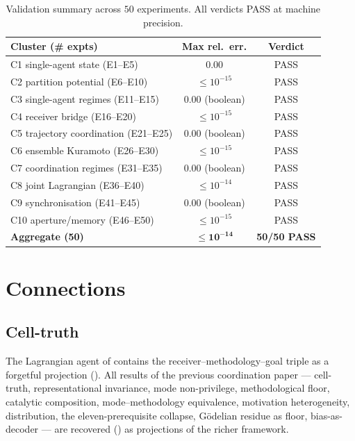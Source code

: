 \documentclass[11pt,twocolumn,a4paper]{article}
\begin{document}
\begin{table}[h!]\centering
\begin{tabular}{lcc}
\toprule
\textbf{Cluster (\# expts)} & \textbf{Max rel.\ err.} & \textbf{Verdict}\\\midrule
C1 single-agent state (E1--E5) & $0.00$ & PASS\\
C2 partition potential (E6--E10) & $\le 10^{-15}$ & PASS\\
C3 single-agent regimes (E11--E15) & $0.00$ (boolean) & PASS\\
C4 receiver bridge (E16--E20) & $\le 10^{-15}$ & PASS\\
C5 trajectory coordination (E21--E25) & $0.00$ (boolean) & PASS\\
C6 ensemble Kuramoto (E26--E30) & $\le 10^{-15}$ & PASS\\
C7 coordination regimes (E31--E35) & $0.00$ (boolean) & PASS\\
C8 joint Lagrangian (E36--E40) & $\le 10^{-14}$ & PASS\\
C9 synchronisation (E41--E45) & $0.00$ (boolean) & PASS\\
C10 aperture/memory (E46--E50) & $\le 10^{-15}$ & PASS\\\midrule
\textbf{Aggregate (50)} & $\mathbf{\le 10^{-14}}$ & \textbf{50/50 PASS}\\\bottomrule
\end{tabular}
\caption{Validation summary across $50$ experiments. All verdicts PASS
at machine precision.}
\label{tab:validation}
\end{table}


\section{Connections}
\label{sec:connections}

\subsection{Cell-truth}
The Lagrangian agent of  contains the
receiver--methodology--goal triple as a forgetful projection
(). All results of the previous
coordination paper --- cell-truth, representational invariance, mode
non-privilege, methodological floor, catalytic composition,
mode--methodology equivalence, motivation heterogeneity, distribution,
the eleven-prerequisite collapse, Gödelian residue as floor,
bias-as-decoder --- are recovered ()
as projections of the richer framework.
\end{document}
